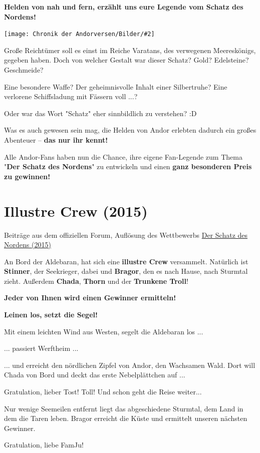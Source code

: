 \documentclass[10pt, a4paper, oneside]{book}
\newcommand{\fillbreak}{\vspace*{\fill}\columnbreak}
\newcommand{\storytext}[1]{%
    \section{#1}%
    \label{Storytext: #1}%
}
\newcommand{\refprodukt}[1]{\hyperref[Produkt: #1]{#1}}
\newcommand{\bildmitts}[2][height=0.32\textwidth,width=0.48\textwidth,keepaspectratio]{%
    \begin{center}
        \texttt{[image: Chronik der Andorversen/Bilder/\#2]}
    \end{center}
}
\begin{document}
\begin{multicols}{2}
\textbf{Helden von nah und fern, erzählt uns eure Legende vom Schatz des Nordens!}

\bildmitts{Der Schatz des Nordens.jpeg}

Große Reichtümer soll es einst im Reiche Varatans, des verwegenen Meereskönigs, gegeben haben. Doch von welcher Gestalt war dieser Schatz?
Gold? Edelsteine? Geschmeide?

Eine besondere Waffe? Der geheimnisvolle Inhalt einer Silbertruhe? Eine verlorene Schiffsladung mit Fässern voll ...?

Oder war das Wort "Schatz" eher sinnbildlich zu verstehen? :D

Was es auch gewesen sein mag, die Helden von Andor erlebten dadurch ein großes Abenteuer – \textbf{das nur ihr kennt!}

Alle Andor-Fans haben nun die Chance, ihre eigene Fan-Legende zum Thema "\textbf{Der Schatz des Nordens}" zu entwickeln und einen \textbf{ganz besonderen Preis zu gewinnen!}


\fillbreak
\storytext{Illustre Crew (2015)}

\begin{center}
    Beiträge aus dem offiziellen Forum, Auflösung des Wettbewerbs \refprodukt{Der Schatz des Nordens (2015)}
\end{center}

An Bord der Aldebaran, hat sich eine \textbf{illustre Crew} versammelt.
Natürlich ist \textbf{Stinner}, der Seekrieger, dabei und \textbf{Bragor}, den es nach Hause, nach Sturmtal zieht. Außerdem \textbf{Chada}, \textbf{Thorn} und der \textbf{Trunkene Troll}!

\textbf{Jeder von Ihnen wird einen Gewinner ermitteln!}

\textbf{Leinen los, setzt die Segel!}

Mit einem leichten Wind aus Westen, segelt die Aldebaran los ...

... passiert Werftheim ...

... und erreicht den nördlichen Zipfel von Andor, den Wachsamen Wald. Dort will Chada von Bord und deckt das erste Nebelplättchen auf ...

Gratulation, lieber Tost! Toll! Und schon geht die Reise weiter...

Nur wenige Seemeilen entfernt liegt das abgeschiedene Sturmtal, dem Land in dem die Taren leben. Bragor erreicht die Küste und ermittelt unseren nächsten Gewinner.

Gratulation, liebe FamJu!


\end{multicols}
\end{document}
